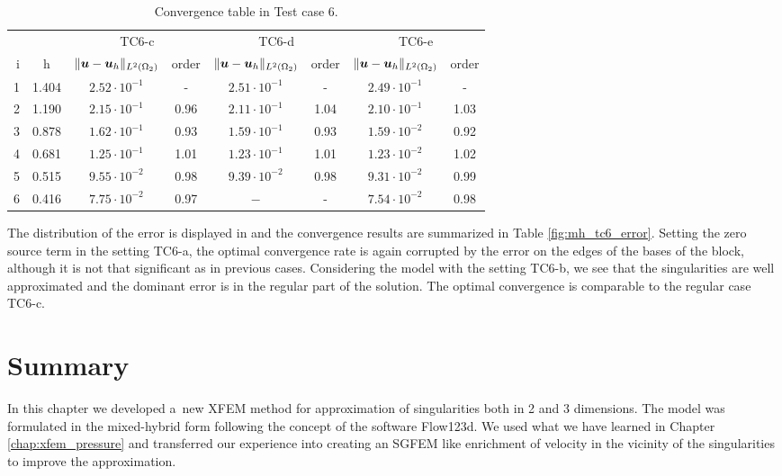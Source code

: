 \begin{table}[!htb]
\begin{center}
\bgroup
\def\arraystretch{1.2}
\setlength\tabcolsep{5pt}
\begin{tabular}{rc|cc|cc|cc}
\toprule
\multicolumn{2}{c|}{} & \multicolumn{2}{c|}{ TC6-c } & \multicolumn{2}{c|}{ TC6-d } & \multicolumn{2}{c}{TC6-e}\\ [3pt] %
i & h & $\|\mathbf{\boldsymbol{u}}-\mathbf{\boldsymbol{u}}_h\|_{L^2(\Omega_2)}$ & order & $\|\mathbf{\boldsymbol{u}}-\mathbf{\boldsymbol{u}}_h\|_{L^2(\Omega_2)}$
    & order & $\|\mathbf{\boldsymbol{u}}-\mathbf{\boldsymbol{u}}_h\|_{L^2(\Omega_2)}$ & order \\ [3pt] \midrule
1 & 1.404 &  $2.52\cdot10^{-1}$  &  -   & $2.51\cdot10^{-1}$ &  -   &  $2.49\cdot10^{-1}$ &   -   \\
2 & 1.190 &  $2.15\cdot10^{-1}$  & 0.96 & $2.11\cdot10^{-1}$ & 1.04 &  $2.10\cdot10^{-1}$ &  1.03 \\
3 & 0.878 &  $1.62\cdot10^{-1}$  & 0.93 & $1.59\cdot10^{-1}$ & 0.93 &  $1.59\cdot10^{-2}$ &  0.92 \\
4 & 0.681 &  $1.25\cdot10^{-1}$  & 1.01 & $1.23\cdot10^{-1}$ & 1.01 &  $1.23\cdot10^{-2}$ &  1.02 \\
5 & 0.515 &  $9.55\cdot10^{-2}$  & 0.98 & $9.39\cdot10^{-2}$ & 0.98 &  $9.31\cdot10^{-2}$ &  0.99 \\
6 & 0.416 &  $7.75\cdot10^{-2}$  & 0.97 & $-$                & -    &  $7.54\cdot10^{-2}$ &  0.98 \\
\bottomrule
\end{tabular}
\caption{Convergence table in Test case 6.}
\label{tab:mh_tc6_convergence}
\egroup
\end{center}
\end{table}

The distribution of the error is displayed in 
and the convergence results are summarized in Table \ref{fig:mh_tc6_error}.
Setting the zero source term in the setting TC6-a, the optimal convergence rate is again corrupted by the error on the edges of the bases of the block,
although it is not that significant as in previous cases.
Considering the model with the setting TC6-b, we see that the singularities are well approximated
and the dominant error is in the regular part of the solution. The optimal convergence is comparable to the regular case TC6-c.

\section{Summary}
In this chapter we developed a~new XFEM method for approximation of singularities both in 2 and 3 dimensions.
The model was formulated in the mixed-hybrid form following the concept of the software Flow123d.
We used what we have learned in Chapter \ref{chap:xfem_pressure} and transferred our experience into creating
an SGFEM like enrichment of velocity in the vicinity of the singularities to improve the approximation.

